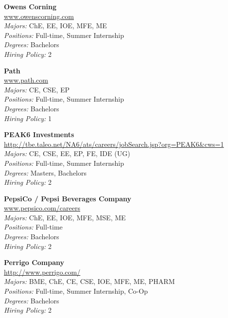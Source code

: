 \documentclass{article}
\begin{document}
\begin{center}
\begin{multicols}{3}
\begin{minipage}{.9\columnwidth}{\Large\bf Owens Corning }\\
	\url{www.owenscorning.com}\\
	\emph{Majors:} ChE, EE, IOE, MFE, ME\\
	\emph{Positions:} Full-time, Summer Internship\\
	\emph{Degrees:} Bachelors\\
	\emph{Hiring Policy:} 2\\
\end{minipage}
 
\begin{minipage}{.9\columnwidth}{\Large\bf Path }\\
	\url{www.path.com}\\
	\emph{Majors:} CE, CSE, EP\\
	\emph{Positions:} Full-time, Summer Internship\\
	\emph{Degrees:} Bachelors\\
	\emph{Hiring Policy:} 1\\
\end{minipage}
 
\begin{minipage}{.9\columnwidth}{\Large\bf PEAK6 Investments }\\
	\url{http://tbe.taleo.net/NA6/ats/careers/jobSearch.jsp?org=PEAK6&cws=1}\\
	\emph{Majors:} CE, CSE, EE, EP, FE, IDE (UG)\\
	\emph{Positions:} Full-time, Summer Internship\\
	\emph{Degrees:} Masters, Bachelors\\
	\emph{Hiring Policy:} 2\\
\end{minipage}
 
\begin{minipage}{.9\columnwidth}{\Large\bf PepsiCo / Pepsi Beverages Company }\\
	\url{www.pepsico.com/careers}\\
	\emph{Majors:} ChE, EE, IOE, MFE, MSE, ME\\
	\emph{Positions:} Full-time\\
	\emph{Degrees:} Bachelors\\
	\emph{Hiring Policy:} 2\\
\end{minipage}
 
\begin{minipage}{.9\columnwidth}{\Large\bf Perrigo Company }\\
	\url{http://www.perrigo.com/}\\
	\emph{Majors:} BME, ChE, CE, CSE, IOE, MFE, ME, PHARM\\
	\emph{Positions:} Full-time, Summer Internship, Co-Op\\
	\emph{Degrees:} Bachelors\\
	\emph{Hiring Policy:} 2\\
\end{minipage}
 

\end{multicols}
\end{center}
\end{document}
